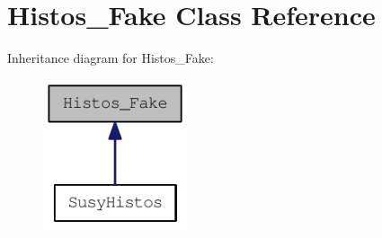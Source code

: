 \hypertarget{classHistos__Fake}{
\section{Histos\_\-Fake Class Reference}
\label{classHistos__Fake}
}
Inheritance diagram for Histos\_\-Fake:\nopagebreak
\begin{figure}[H]
\begin{center}
\leavevmode
\includegraphics[width=120pt]{classHistos__Fake__inherit__graph}
\end{center}
\end{figure}
